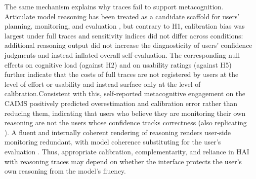 \documentclass[acmlarge,review=true, anonymous=true]{acmart}
\begin{document}
The same mechanism explains why traces fail to support metacognition. Articulate model reasoning has been treated as a candidate scaffold for users' planning, monitoring, and evaluation \cite{FERNANDES2026108779}, but contrary to H1, calibration bias was largest under full traces and sensitivity indices did not differ across conditions: additional reasoning output did not increase the diagnosticity of users' confidence judgments and instead inflated overall self-evaluation. The corresponding null effects on cognitive load (against H2) and on usability ratings (against H5) further indicate that the costs of full traces are not registered by users at the level of effort or usability and instead surface only at the level of calibration.Consistent with this, self-reported metacognitive engagement on the CAIMS positively predicted overestimation and calibration error rather than reducing them, indicating that users who believe they are monitoring their own reasoning are not the users whose confidence tracks correctness (also replicating \cite{FERNANDES2026108779}). A fluent and internally coherent rendering of reasoning renders user-side monitoring redundant, with model coherence substituting for the user's evaluation \cite{}. Thus, appropriate calibration, complementarity, and reliance in HAI with reasoning traces may depend on whether the interface protects the user's own reasoning from the model's fluency.


\end{document}

